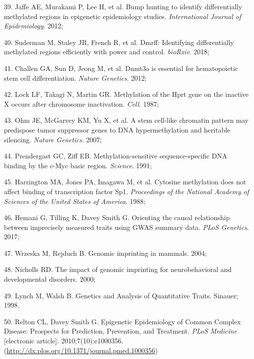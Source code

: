 \documentclass[11pt,oneside]{bristolthesis}
\newenvironment{cslreferences}%
  {}%
  {\par}
\begin{document}
\begin{cslreferences}
\leavevmode\hypertarget{ref-Jaffe2012}{}%
39. Jaffe AE, Murakami P, Lee H, et al. Bump hunting to identify differentially methylated regions in epigenetic epidemiology studies. \emph{International Journal of Epidemiology}. 2012;

\leavevmode\hypertarget{ref-Suderman2018}{}%
40. Suderman M, Staley JR, French R, et al. Dmrff: Identifying differentially methylated regions efficiently with power and control. \emph{bioRxiv}. 2018;

\leavevmode\hypertarget{ref-Challen2012}{}%
41. Challen GA, Sun D, Jeong M, et al. Dnmt3a is essential for hematopoietic stem cell differentiation. \emph{Nature Genetics}. 2012;

\leavevmode\hypertarget{ref-Lock1987}{}%
42. Lock LF, Takagi N, Martin GR. Methylation of the Hprt gene on the inactive X occurs after chromosome inactivation. \emph{Cell}. 1987;

\leavevmode\hypertarget{ref-Ohm2007}{}%
43. Ohm JE, McGarvey KM, Yu X, et al. A stem cell-like chromatin pattern may predispose tumor suppressor genes to DNA hypermethylation and heritable silencing. \emph{Nature Genetics}. 2007;

\leavevmode\hypertarget{ref-Prendergast1991}{}%
44. Prendergast GC, Ziff EB. Methylation-sensitive sequence-specific DNA binding by the c-Myc basic region. \emph{Science}. 1991;

\leavevmode\hypertarget{ref-Harrington1988}{}%
45. Harrington MA, Jones PA, Imagawa M, et al. Cytosine methylation does not affect binding of transcription factor Sp1. \emph{Proceedings of the National Academy of Sciences of the United States of America}. 1988;

\leavevmode\hypertarget{ref-Hemani2017}{}%
46. Hemani G, Tilling K, Davey Smith G. Orienting the causal relationship between imprecisely measured traits using GWAS summary data. \emph{PLoS Genetics}. 2017;

\leavevmode\hypertarget{ref-Wrzeska2004}{}%
47. Wrzeska M, Rejduch B. Genomic imprinting in mammals. 2004;

\leavevmode\hypertarget{ref-Nicholls2000}{}%
48. Nicholls RD. The impact of genomic imprinting for neurobehavioral and developmental disorders. 2000;

\leavevmode\hypertarget{ref-Lynch1998}{}%
49. Lynch M, Walsh B. Genetics and Analysis of Quantitative Traits. Sinauer; 1998.

\leavevmode\hypertarget{ref-Relton2010}{}%
50. Relton CL, Davey Smith G. Epigenetic Epidemiology of Common Complex Disease: Prospects for Prediction, Prevention, and Treatment. \emph{PLoS Medicine} {[}electronic article{]}. 2010;7(10):e1000356. (\url{http://dx.plos.org/10.1371/journal.pmed.1000356})


\end{cslreferences}
\end{document}

